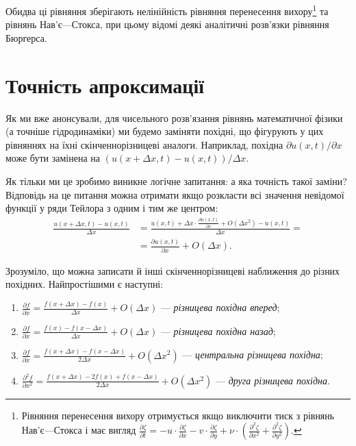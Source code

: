 Обидва ці рівняння зберігають нелінійність рівняння перенесення вихору\footnote{Рівняння перенесення вихору отримується якщо виключити тиск з рівнянь Нав'є---Стокса і має вигляд $\frac{\partial \zeta}{\partial t} = - u \cdot \frac{\partial \zeta}{\partial x} - v \cdot \frac{\partial \zeta}{\partial y} + \nu \cdot \left( \frac{\partial^2 \zeta}{\partial x^2} + \frac{\partial^2 \zeta}{\partial y^2} \right)$.} та рівнянь Нав'є---Стокса, при цьому відомі деякі аналітичні розв'язки рівняння Бюргерса.

\section{Точність апроксимації}

Як ми вже анонсували, для чисельного розв'язання рівнянь математичної фізики (а точніше гідродинаміки) ми будемо заміняти похідні, що фігурують у цих рівняннях на їхні скінченнорізницеві аналоги. Наприклад, похідна $\partial u(x, t) / \partial x$ може бути замінена на $( u(x + \Delta x, t) - u(x, t) ) / \Delta x $. \medskip

Як тільки ми це зробимо виникне логічне запитання: а яка точність такої заміни? Відповідь на це питання можна отримати якщо розкласти всі значення невідомої функції у ряди Тейлора з одним і тим же центром:
\begin{equation}
    \begin{aligned}
        \frac{u(x + \Delta x, t) - u(x, t)}{\Delta x} &= \frac{u(x, t) + \Delta x \cdot \frac{\partial u(x, t)}{\partial x} + O(\Delta x^2) - u(x, t)}{\Delta x} = \\
        &= \frac{\partial u(x, t)}{\partial x} + O(\Delta x).
    \end{aligned}
\end{equation}

Зрозуміло, що можна записати й інші скінченнорізницеві наближення до різних похідних. Найпростішими є наступні:
\begin{enumerate}
    \item $\frac{\partial f}{\partial x} = \frac{f(x + \Delta x) - f(x)}{\Delta x} + O(\Delta x)$ --- \textit{різницева похідна вперед};
    \item $\frac{\partial f}{\partial x} = \frac{f(x) - f(x - \Delta x)}{\Delta x} + O(\Delta x)$ --- \textit{різницева похідна назад};
    \item $\frac{\partial f}{\partial x} = \frac{f(x + \Delta x) - f(x - \Delta x)}{2 \Delta x} + O(\Delta x^2)$ --- \textit{центральна різницева похідна};
    \item $\frac{\partial^2 f}{\partial x^2} = \frac{f(x + \Delta x) - 2 f(x) + f(x - \Delta x)}{2 \Delta x} + O(\Delta x^2)$ --- \textit{друга різницева похідна}.
\end{enumerate}

